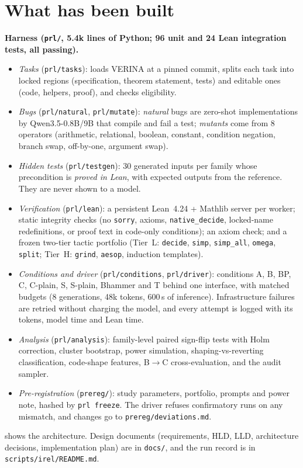 \documentclass[10pt,twocolumn]{article}
\begin{document}
\section{What has been built}
\textbf{Harness (\texttt{prl/}, 5.4k lines of Python; 96 unit and 24 Lean integration tests, all passing).}
\begin{itemize}
\item \emph{Tasks} (\texttt{prl/tasks}): loads VERINA at a pinned commit, splits each task into locked regions
(specification, theorem statement, tests) and editable ones (code, helpers, proof), and checks eligibility.
\item \emph{Bugs} (\texttt{prl/natural}, \texttt{prl/mutate}): \emph{natural} bugs are zero-shot implementations by
Qwen3.5-0.8B/9B that compile and fail a test; \emph{mutants} come from 8 operators (arithmetic, relational, boolean,
constant, condition negation, branch swap, off-by-one, argument swap).
\item \emph{Hidden tests} (\texttt{prl/testgen}): 30 generated inputs per family whose precondition is \emph{proved
in Lean}, with expected outputs from the reference. They are never shown to a model.
\item \emph{Verification} (\texttt{prl/lean}): a persistent Lean~4.24 + Mathlib server per worker; static
integrity checks (no \texttt{sorry}, axioms, \texttt{native\_decide}, locked-name redefinitions, or proof text in
code-only conditions); an axiom check; and a frozen two-tier tactic portfolio (Tier~L: \texttt{decide},
\texttt{simp}, \texttt{simp\_all}, \texttt{omega}, \texttt{split}; Tier~H: \texttt{grind}, \texttt{aesop},
induction templates).
\item \emph{Conditions and driver} (\texttt{prl/conditions}, \texttt{prl/driver}): conditions A, B, BP, C,
C-plain, S, S-plain, Bhammer and T behind one interface, with matched budgets (8 generations, 48k tokens, 600\,s
of inference). Infrastructure failures are retried without charging the model, and every attempt is logged with
its tokens, model time and Lean time.
\item \emph{Analysis} (\texttt{prl/analysis}): family-level paired sign-flip tests with Holm correction, cluster
bootstrap, power simulation, shaping-vs-reverting classification, code-shape features, B$\to$C
cross-evaluation, and the audit sampler.
\item \emph{Pre-registration} (\texttt{prereg/}): study parameters, portfolio, prompts and power note, hashed by
\texttt{prl freeze}. The driver refuses confirmatory runs on any mismatch, and changes go to
\texttt{prereg/deviations.md}.
\end{itemize}
 shows the architecture. Design documents (requirements, HLD, LLD, architecture decisions,
implementation plan) are in \texttt{docs/}, and the run record is in \texttt{scripts/irel/README.md}.
\end{document}
